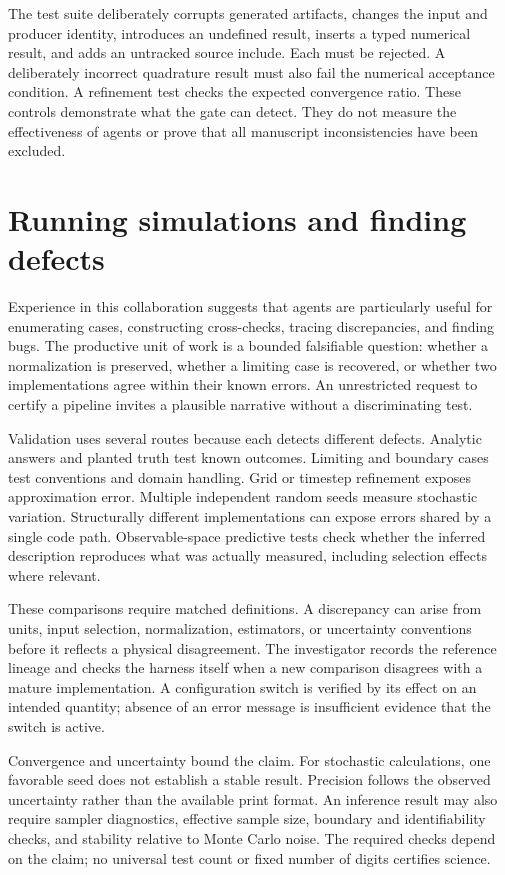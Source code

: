 \documentclass{article}
\begin{document}
The test suite deliberately corrupts generated artifacts, changes the input and producer identity, introduces an undefined result, inserts a typed numerical result, and adds an untracked source include. Each must be rejected. A deliberately incorrect quadrature result must also fail the numerical acceptance condition. A refinement test checks the expected convergence ratio. These controls demonstrate what the gate can detect. They do not measure the effectiveness of agents or prove that all manuscript inconsistencies have been excluded.

\section{Running simulations and finding defects}
Experience in this collaboration suggests that agents are particularly useful for enumerating cases, constructing cross-checks, tracing discrepancies, and finding bugs. The productive unit of work is a bounded falsifiable question: whether a normalization is preserved, whether a limiting case is recovered, or whether two implementations agree within their known errors. An unrestricted request to certify a pipeline invites a plausible narrative without a discriminating test.

Validation uses several routes because each detects different defects. Analytic answers and planted truth test known outcomes. Limiting and boundary cases test conventions and domain handling. Grid or timestep refinement exposes approximation error. Multiple independent random seeds measure stochastic variation. Structurally different implementations can expose errors shared by a single code path. Observable-space predictive tests check whether the inferred description reproduces what was actually measured, including selection effects where relevant.

These comparisons require matched definitions. A discrepancy can arise from units, input selection, normalization, estimators, or uncertainty conventions before it reflects a physical disagreement. The investigator records the reference lineage and checks the harness itself when a new comparison disagrees with a mature implementation. A configuration switch is verified by its effect on an intended quantity; absence of an error message is insufficient evidence that the switch is active.

Convergence and uncertainty bound the claim. For stochastic calculations, one favorable seed does not establish a stable result. Precision follows the observed uncertainty rather than the available print format. An inference result may also require sampler diagnostics, effective sample size, boundary and identifiability checks, and stability relative to Monte Carlo noise. The required checks depend on the claim; no universal test count or fixed number of digits certifies science.
\end{document}
